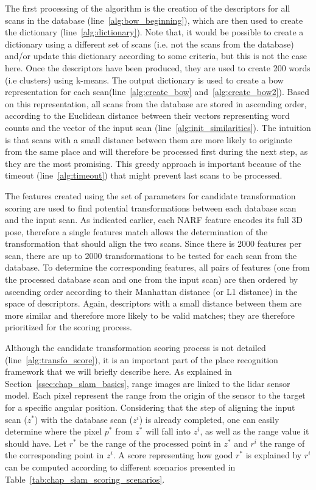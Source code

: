 The first processing of the algorithm is the creation of the descriptors for all scans in the database (line~\ref{alg:bow_beginning}), which are then used to create the dictionary (line~\ref{alg:dictionary}). Note that, it would be possible to create a dictionary using a different set of scans (i.e. not the scans from the database) and/or update this dictionary according to some criteria, but this is not the case here. Once the descriptors have been produced, they are used to create 200 words (i.e clusters) using k-means. The output dictionary is used to create a \gls*{bow} representation for each scan(line~\ref{alg:create_bow} and~\ref{alg:create_bow2}). Based on this representation, all scans from the database are stored in ascending order, according to the Euclidean distance between their vectors representing word counts and the vector of the input scan (line~\ref{alg:init_similarities}). The intuition is that scans with a small distance between them are more likely to originate from the same place and will therefore be processed first during the next step, as they are the most promising. This greedy approach is important because of the timeout (line~\ref{alg:timeout}) that might prevent last scans to be processed.

The features created using the set of parameters for candidate transformation scoring are used to find potential transformations between each database scan and the input scan. As indicated earlier, each NARF feature encodes its full 3D pose, therefore a single features match allows the determination of the transformation that should align the two scans. Since there is 2000 features per scan, there are up to 2000 transformations to be tested for each scan from the database. To determine the corresponding features, all pairs of features (one from the processed database scan and one from the input scan) are then ordered by ascending order according to their Manhattan distance (or L1 distance) in the space of descriptors. Again, descriptors with a small distance between them are more similar and therefore more likely to be valid matches; they are therefore prioritized for the scoring process.

Although the candidate transformation scoring process is not detailed (line~\ref{alg:transfo_score}), it is an important part of the place recognition framework that we will briefly describe here. As explained in Section~\ref{ssec:chap_slam_basics}, range images are linked to the \gls*{lidar} sensor model. Each pixel represent the range from the origin of the sensor to the target for a specific angular position. Considering that the step of aligning the input scan ($z^*$) with the database scan ($z^i$) is already completed, one can easily determine where the pixel $p^*$ from $z^*$ will fall into $z^i$, as well as the range value it should have. Let $r^*$ be the range of the processed point in $z^*$ and $r^i$ the range of the corresponding point in $z^i$. A score representing how good $r^*$ is explained by $r^i$ can be computed according to different scenarios presented in Table~\ref{tab:chap_slam_scoring_scenarios}.

